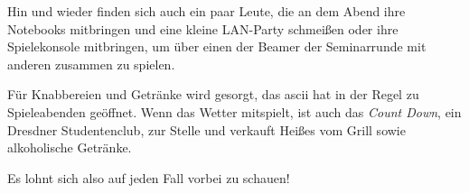 Hin und wieder finden sich auch ein paar Leute, die an dem Abend ihre Notebooks mitbringen und eine kleine LAN-Party schmeißen oder ihre Spielekonsole mitbringen, um über einen der Beamer der Seminarrunde mit anderen zusammen zu spielen.

Für Knabbereien und Getränke wird gesorgt, das ascii hat in der Regel zu Spieleabenden geöffnet. Wenn das Wetter mitspielt, ist auch das \emph{Count Down}, ein Dresdner Studentenclub, zur Stelle und verkauft Heißes vom Grill sowie alkoholische Getränke.

Es lohnt sich also auf jeden Fall vorbei zu schauen!


\pagebreak

\
\thispagestyle{empty}
